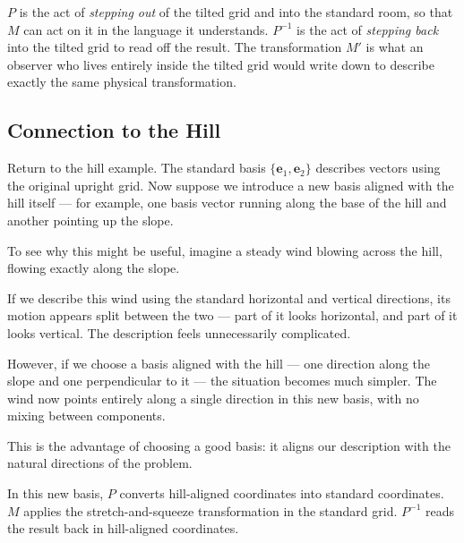 \documentclass[11pt,openany]{book}
\theoremstyle{definition}
\begin{document}
\medskip

$P$ is the act of \textit{stepping out} of the tilted grid and into the standard room, 
so that $M$ can act on it in the language it understands. $P^{-1}$ is the act of 
\textit{stepping back} into the tilted grid to read off the result. The transformation 
$M'$ is what an observer who lives entirely inside the tilted grid would write down 
to describe exactly the same physical transformation.


\subsection{Connection to the Hill}

Return to the hill example. The standard basis $\{\mathbf{e}_1, \mathbf{e}_2\}$ 
describes vectors using the original upright grid. Now suppose we introduce a new 
basis aligned with the hill itself --- for example, one basis vector running along 
the base of the hill and another pointing up the slope.

\medskip

To see why this might be useful, imagine a steady wind blowing across the hill, 
flowing exactly along the slope.

\medskip

If we describe this wind using the standard horizontal and vertical directions, 
its motion appears split between the two --- part of it looks horizontal, and part 
of it looks vertical. The description feels unnecessarily complicated.

\medskip

However, if we choose a basis aligned with the hill --- one direction along the slope 
and one perpendicular to it --- the situation becomes much simpler. The wind now points 
entirely along a single direction in this new basis, with no mixing between components.

\medskip

This is the advantage of choosing a good basis: it aligns our description with the 
natural directions of the problem.

\medskip

In this new basis, $P$ converts hill-aligned coordinates into standard coordinates. 
$M$ applies the stretch-and-squeeze transformation in the standard grid. $P^{-1}$ 
reads the result back in hill-aligned coordinates.
\end{document}
